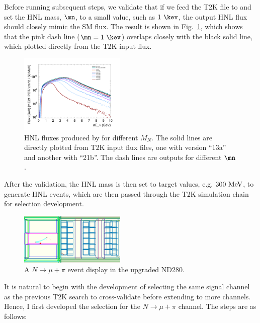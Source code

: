        Before running subsequent steps, we validate that if we feed the T2K  file to  and set the HNL mass, $\mn$, to a small value, such as $1~\kev$, the output HNL flux should closely mimic the SM flux. 
        The result is shown in Fig.~\ref{fig:hnl-fluxes}, which shows that the pink dash line ($\mn=1~\kev$) overlaps closely with the black solid line, which plotted directly from the T2K input flux.  
        \begin{figure}[!htb] 
            \centering 		
            \includegraphics[width=0.45\textwidth]{figures/hnl_fluxes.png}
            \caption{\label{fig:hnl-fluxes} HNL fluxes produced by  for different $M_N$. The solid lines are directly plotted from T2K input flux files, one with version ``13a'' and another with ``21b''. The dash lines are  outputs for different $\mn$.} 
        \end{figure}
        After the validation, the HNL mass is then set to target values, e.g. $300~\textrm{MeV}$, to generate HNL events, which are then passed through the T2K simulation chain for selection development. 
        \begin{figure}[!htb] 
            \centering 		
            \includegraphics[width=0.45\textwidth]{figures/HNLEveDIs.png}
            \caption{\label{fig:hnl-evedis} A $N\rightarrow\mu+\pi$ event display in the upgraded ND280.} 
        \end{figure}

        It is natural to begin with the development of selecting the same signal channel as the previous T2K search to cross-validate before extending to more channels. Hence, I first developed the selection for the $N\rightarrow\mu+\pi$ channel. The steps are as follows:

